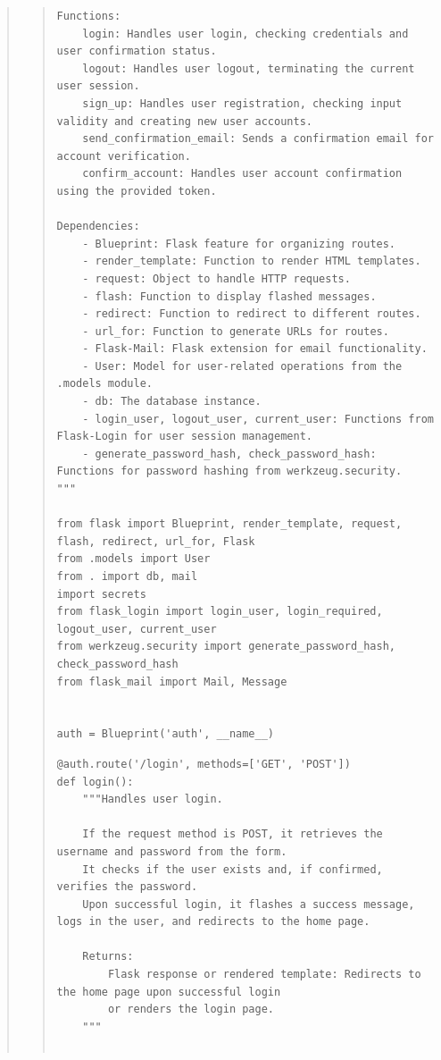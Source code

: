 \documentclass{article}
\begin{document}
\begin{quote}
\begin{quote}
\begin{tcolorbox}[colback=grisClair,colframe=black]
\begin{lstlisting}
Functions:
    login: Handles user login, checking credentials and user confirmation status.
    logout: Handles user logout, terminating the current user session.
    sign_up: Handles user registration, checking input validity and creating new user accounts.
    send_confirmation_email: Sends a confirmation email for account verification.
    confirm_account: Handles user account confirmation using the provided token.

Dependencies:
    - Blueprint: Flask feature for organizing routes.
    - render_template: Function to render HTML templates.
    - request: Object to handle HTTP requests.
    - flash: Function to display flashed messages.
    - redirect: Function to redirect to different routes.
    - url_for: Function to generate URLs for routes.
    - Flask-Mail: Flask extension for email functionality.
    - User: Model for user-related operations from the .models module.
    - db: The database instance.
    - login_user, logout_user, current_user: Functions from Flask-Login for user session management.
    - generate_password_hash, check_password_hash: Functions for password hashing from werkzeug.security.
"""

from flask import Blueprint, render_template, request, flash, redirect, url_for, Flask
from .models import User 
from . import db, mail
import secrets
from flask_login import login_user, login_required, logout_user, current_user
from werkzeug.security import generate_password_hash, check_password_hash
from flask_mail import Mail, Message


auth = Blueprint('auth', __name__)
            \end{lstlisting}       
        \end{tcolorbox}

        \begin{tcolorbox}[colback=grisClair,colframe=black]
        \begin{lstlisting}
@auth.route('/login', methods=['GET', 'POST'])
def login():
    """Handles user login.

    If the request method is POST, it retrieves the username and password from the form.
    It checks if the user exists and, if confirmed, verifies the password.
    Upon successful login, it flashes a success message, logs in the user, and redirects to the home page.

    Returns:
        Flask response or rendered template: Redirects to the home page upon successful login
        or renders the login page.
    """


\end{lstlisting}
\end{tcolorbox}
\end{quote}
\end{quote}
\end{document}
